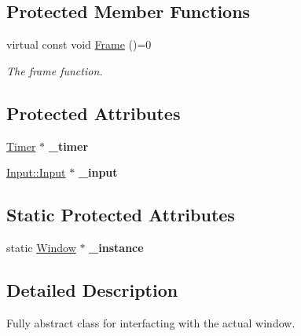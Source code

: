 \subsection*{Protected Member Functions}
\begin{DoxyCompactItemize}
\item 
virtual const void \hyperlink{class_ensum_1_1_core_1_1_window_a58af9c1b06e0fe12820f584f4638ae15}{Frame} ()=0
\begin{DoxyCompactList}\small\item\em The frame function. \end{DoxyCompactList}\end{DoxyCompactItemize}
\subsection*{Protected Attributes}
\begin{DoxyCompactItemize}
\item 
\hyperlink{class_ensum_1_1_core_1_1_timer}{Timer} $\ast$ {\bfseries \+\_\+timer}\hypertarget{class_ensum_1_1_core_1_1_window_aa27d25534350ec8e46cf2eae67c82ea5}{}\label{class_ensum_1_1_core_1_1_window_aa27d25534350ec8e46cf2eae67c82ea5}

\item 
\hyperlink{class_ensum_1_1_input_1_1_input}{Input\+::\+Input} $\ast$ {\bfseries \+\_\+input}\hypertarget{class_ensum_1_1_core_1_1_window_a6b2925a490f7a5a2417059660713bc19}{}\label{class_ensum_1_1_core_1_1_window_a6b2925a490f7a5a2417059660713bc19}

\end{DoxyCompactItemize}
\subsection*{Static Protected Attributes}
\begin{DoxyCompactItemize}
\item 
static \hyperlink{class_ensum_1_1_core_1_1_window}{Window} $\ast$ {\bfseries \+\_\+instance}\hypertarget{class_ensum_1_1_core_1_1_window_aa4ca94e77186512ab2949dd6c7e850e6}{}\label{class_ensum_1_1_core_1_1_window_aa4ca94e77186512ab2949dd6c7e850e6}

\end{DoxyCompactItemize}


\subsection{Detailed Description}
Fully abstract class for interfacting with the actual window. 

